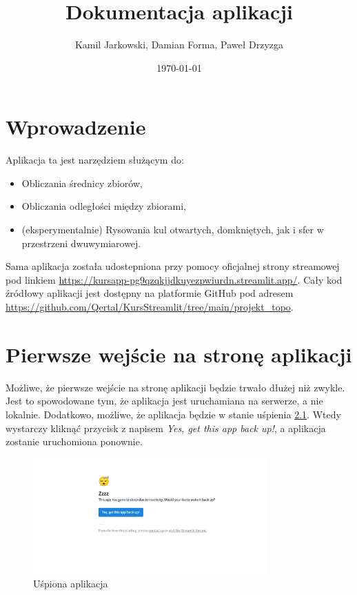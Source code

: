 \documentclass[a4paper,twoside,11pt]{mwrep}
\title{Dokumentacja aplikacji}
\author{Kamil Jarkowski, Damian Forma, Paweł Drzyzga}
\date{\today}
\begin{document}
\maketitle

\chapter{Wprowadzenie}

Aplikacja ta jest narzędziem służącym do:
\begin{itemize}
    \item Obliczania średnicy zbiorów,
    \item Obliczania odległości między zbiorami,
    \item (eksperymentalnie) Rysowania kul otwartych, domkniętych, jak i sfer w przestrzeni dwuwymiarowej.
\end{itemize}

Sama aplikacja została udostepniona przy pomocy oficjalnej strony streamowej pod linkiem \url{https://kursapp-pg9qzqkjjdkuyezpwiurdn.streamlit.app/}. Cały kod źródłowy aplikacji jest dostępny na platformie GitHub pod adresem \url{https://github.com/Qertal/KursStreamlit/tree/main/projekt_topo}.

\chapter{Pierwsze wejście na stronę aplikacji}

Możliwe, że pierwsze wejście na stronę aplikacji będzie trwało dłużej niż zwykle. Jest to spowodowane tym, że aplikacja jest uruchamiana na serwerze, a nie lokalnie. Dodatkowo, możliwe, że aplikacja będzie w stanie uśpienia \ref{rys:usp}. Wtedy wystarczy kliknąć przycisk z napisem \textit{Yes, get this app back up!}, a aplikacja zostanie uruchomiona ponownie.


\begin{figure}[H] 
    \centering
    \includegraphics[width=0.8\textwidth]{figure/Obraz1.png}
    \caption{Uśpiona aplikacja}\label{rys:usp}
\end{figure}
\end{document}
